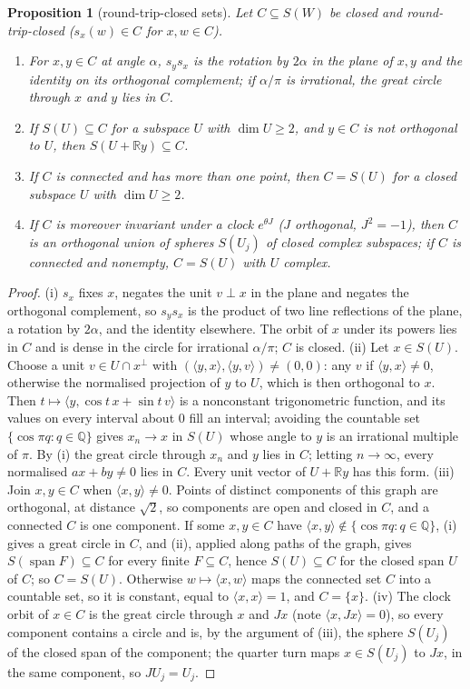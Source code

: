 \documentclass[aps,pra,onecolumn,superscriptaddress,nofootinbib,10pt]{revtex4-2}
\newtheorem{proposition}[theorem]{Proposition}
\theoremstyle{definition}
\theoremstyle{remark}
\newcommand{\R}{\mathbb{R}}
\newcommand{\ip}[2]{\langle #1,#2\rangle}
\begin{document}
\begin{proposition}[round-trip-closed sets]\label{prop:rtclosed}
Let $C\subseteq S(W)$ be closed and round-trip-closed ($s_x(w)\in C$ for $x,w\in C$).
\begin{enumerate}[label=(\roman*),leftmargin=2em]
\item For $x,y\in C$ at angle $\alpha$, $s_ys_x$ is the rotation by $2\alpha$ in the plane of $x,y$ and the identity on its
orthogonal complement; if $\alpha/\pi$ is irrational, the great circle through $x$ and $y$ lies in $C$.
\item If $S(U)\subseteq C$ for a subspace $U$ with $\dim U\ge2$, and $y\in C$ is not orthogonal to $U$, then $S(U+\R y)\subseteq C$.
\item If $C$ is connected and has more than one point, then $C=S(U)$ for a closed subspace $U$ with $\dim U\ge2$.
\item If $C$ is moreover invariant under a clock $e^{\theta J}$ ($J$ orthogonal, $J^2=-1$), then $C$ is an orthogonal union of
spheres $S(U_j)$ of closed complex subspaces; if $C$ is connected and nonempty, $C=S(U)$ with $U$ complex.
\end{enumerate}
\end{proposition}
\begin{proof}
(i) $s_x$ fixes $x$, negates the unit $v\perp x$ in the plane and negates the orthogonal complement, so $s_ys_x$ is the
product of two line reflections of the plane, a rotation by $2\alpha$, and the identity elsewhere.  The orbit of $x$
under its powers lies in $C$ and is dense in the circle for irrational $\alpha/\pi$; $C$ is closed.
(ii) Let $x\in S(U)$.  Choose a unit $v\in U\cap x^\perp$ with $(\ip yx,\ip yv)\ne(0,0)$: any $v$ if $\ip yx\ne0$, otherwise
the normalised projection of $y$ to $U$, which is then orthogonal to $x$.  Then $t\mapsto\ip y{\cos t\,x+\sin t\,v}$ is a
nonconstant trigonometric function, and its values on every interval about $0$ fill an interval; avoiding the
countable set $\{\cos\pi q:q\in\mathbb Q\}$ gives $x_n\to x$ in $S(U)$ whose angle to $y$ is an irrational multiple of $\pi$.  By
(i) the great circle through $x_n$ and $y$ lies in $C$; letting $n\to\infty$, every normalised $ax+by\ne0$ lies in $C$.  Every
unit vector of $U+\R y$ has this form.
(iii) Join $x,y\in C$ when $\ip xy\ne0$.  Points of distinct components of this graph are orthogonal, at distance
$\sqrt2$, so components are open and closed in $C$, and a connected $C$ is one component.  If some $x,y\in C$ have
$\ip xy\notin\{\cos\pi q:q\in\mathbb Q\}$, (i) gives a great circle in $C$, and (ii), applied along paths of the graph,
gives $S(\operatorname{span}F)\subseteq C$ for every finite $F\subseteq C$, hence $S(U)\subseteq C$ for the closed span $U$ of $C$;
so $C=S(U)$.  Otherwise $w\mapsto\ip xw$ maps the connected set $C$ into a countable set, so it is constant,
equal to $\ip xx=1$, and $C=\{x\}$.
(iv) The clock orbit of $x\in C$ is the great circle through $x$ and $Jx$ (note $\ip x{Jx}=0$), so every component
contains a circle and is, by the argument of (iii), the sphere $S(U_j)$ of the closed span of the component; the
quarter turn maps $x\in S(U_j)$ to $Jx$, in the same component, so $JU_j=U_j$.
\end{proof}
\end{document}
